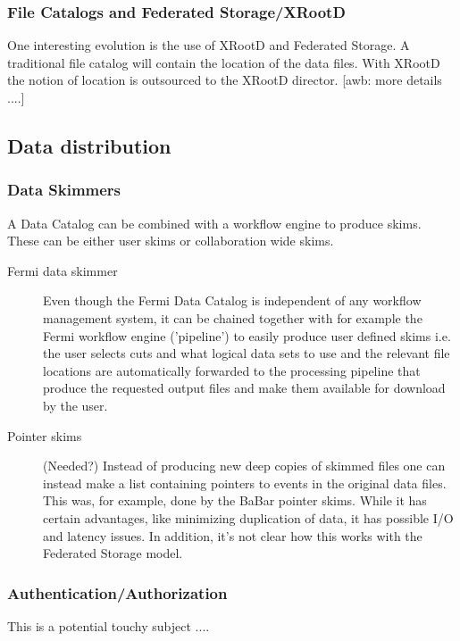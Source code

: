 \subsubsection{File Catalogs and Federated Storage/XRootD}
One interesting evolution is the use of XRootD and Federated Storage. A traditional file catalog will contain the 
location of the data files. With XRootD the notion of location is outsourced to the XRootD director. 
[awb: more details ....]


\subsection{Data distribution}

\subsubsection{Data Skimmers}
A Data Catalog can be combined with a workflow engine to produce skims. These can be either user skims or collaboration 
wide skims. 

\begin{description}
\item[Fermi data skimmer] Even though the Fermi Data Catalog is independent of any workflow management system, it 
can be chained together with for example the Fermi workflow engine ('pipeline') to easily produce user defined skims 
i.e. the user selects cuts and what logical data sets to use and the relevant file locations are automatically 
forwarded to the processing pipeline that produce the requested output files and make them available for download 
by the user. 

\item[Pointer skims] (Needed?) Instead of producing new deep copies of skimmed files one can instead make a list 
containing 
pointers to events in the original data files. This was, for example, done by the BaBar pointer skims. While it has 
certain advantages, like minimizing duplication of data, it has possible I/O and latency issues. In addition, it's not 
clear how this works with the Federated Storage model.
\end{description}

\subsubsection{Authentication/Authorization} This is a potential touchy subject ....  


